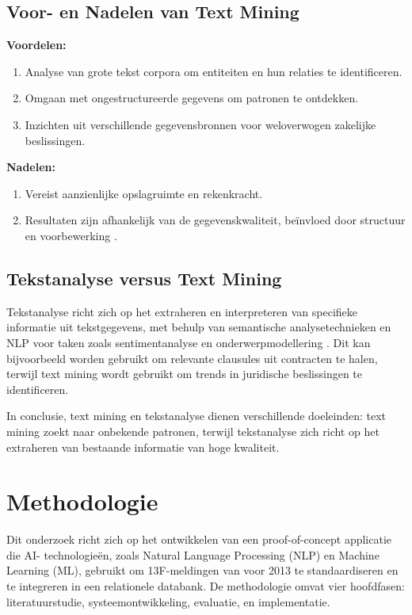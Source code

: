 \subsection{Voor- en Nadelen van Text Mining}

\textbf{Voordelen:}
\begin{enumerate}
    \item Analyse van grote tekst corpora om entiteiten en hun relaties te identificeren.
    \item Omgaan met ongestructureerde gegevens om patronen te ontdekken.
    \item Inzichten uit verschillende gegevensbronnen voor weloverwogen zakelijke beslissingen.
\end{enumerate}

\textbf{Nadelen:}
\begin{enumerate}
    \item Vereist aanzienlijke opslagruimte en rekenkracht.
    \item Resultaten zijn afhankelijk van de gegevenskwaliteit, beïnvloed door structuur en voorbewerking \autocite{Kinter2024, gaikwad2014text}.
\end{enumerate}

\subsection{Tekstanalyse versus Text Mining}

Tekstanalyse richt zich op het extraheren en interpreteren van specifieke informatie uit tekstgegevens, met behulp van semantische analysetechnieken en NLP voor taken zoals sentimentanalyse en onderwerpmodellering \autocite{gaikwad2014text}. Dit kan bijvoorbeeld worden gebruikt om relevante clausules uit contracten te halen, terwijl text mining wordt gebruikt om trends in juridische beslissingen te identificeren.

In conclusie, text mining en tekstanalyse dienen verschillende doeleinden: text mining zoekt naar onbekende patronen, terwijl tekstanalyse zich richt op het extraheren van bestaande informatie van hoge kwaliteit.


\section{Methodologie}
\label{sec:methodologie}

Dit onderzoek richt zich op het ontwikkelen van een proof-of-concept applicatie die AI- technologieën, zoals Natural Language Processing (NLP) en Machine Learning (ML), gebruikt om 13F-meldingen van voor 2013 te standaardiseren en te integreren in een relationele databank. De methodologie omvat vier hoofdfasen: literatuurstudie, systeemontwikkeling, evaluatie, en implementatie.

